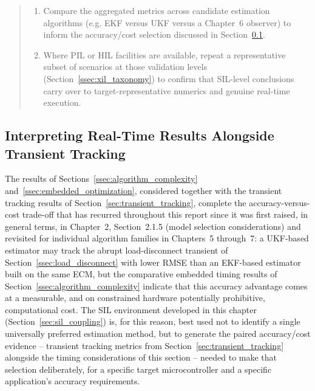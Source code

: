 \begin{quote}
\begin{enumerate}
\begin{enumerate}
\begin{enumerate}
			\item Compute the trial's RMSE, convergence time, and overshoot metrics (Section~\ref{ssec:transient_metrics}) from the logged true and estimated trajectories.
		\end{enumerate}
		\item Aggregate the $N_{\text{trial}}$ trial-level metrics into a mean and standard deviation for the scenario (Table~\ref{tab:sil_metric_summary_template}).
	\end{enumerate}
	\item Compare the aggregated metrics across candidate estimation algorithms (e.g. EKF versus UKF versus a Chapter~6 observer) to inform the accuracy/cost selection discussed in Section~\ref{ssec:realtime_tracking_tradeoff}.
	\item Where PIL or HIL facilities are available, repeat a representative subset of scenarios at those validation levels (Section~\ref{ssec:xil_taxonomy}) to confirm that SIL-level conclusions carry over to target-representative numerics and genuine real-time execution.
\end{enumerate}
\end{quote}

\subsection{Interpreting Real-Time Results Alongside Transient Tracking}
\label{ssec:realtime_tracking_tradeoff}

The results of Sections~\ref{ssec:algorithm_complexity} and~\ref{ssec:embedded_optimization}, considered together with the transient tracking results of Section~\ref{sec:transient_tracking}, complete the accuracy-versus-cost trade-off that has recurred throughout this report since it was first raised, in general terms, in Chapter~2, Section~2.1.5 (model selection considerations) and revisited for individual algorithm families in Chapters~5 through~7: a UKF-based estimator may track the abrupt load-disconnect transient of Section~\ref{ssec:load_disconnect} with lower RMSE than an EKF-based estimator built on the same ECM, but the comparative embedded timing results of Section~\ref{ssec:algorithm_complexity} indicate that this accuracy advantage comes at a measurable, and on constrained hardware potentially prohibitive, computational cost. The SIL environment developed in this chapter (Section~\ref{sec:sil_coupling}) is, for this reason, best used not to identify a single universally preferred estimation method, but to generate the paired accuracy/cost evidence -- transient tracking metrics from Section~\ref{sec:transient_tracking} alongside the timing considerations of this section -- needed to make that selection deliberately, for a specific target microcontroller and a specific application's accuracy requirements.

